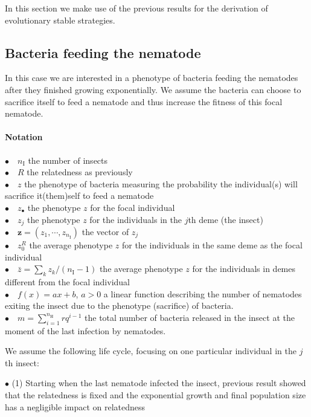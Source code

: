 \documentclass{article}
\newcommand{\nN}{{n_\textrm{H}}}
\newcommand{\nI}{{n_\textrm{I}}}
\begin{document}
 In this section we make use of the previous results for the derivation of evolutionary stable strategies.
 \subsection{Bacteria feeding the nematode}
 In this case we are interested in a phenotype of bacteria feeding the nematodes after they finished growing exponentially. We assume the bacteria can choose to sacrifice itself to feed a nematode and thus increase the fitness of this focal nematode.
 
  \paragraph{Notation} $ $\\
 $\bullet \quad \nI$ the number of insects \\
 $\bullet \quad R$ the relatedness as previously \\
 $\bullet \quad z$ the phenotype of bacteria measuring the probability the individual(s) will sacrifice it(them)self to feed a nematode\\
 $\bullet \quad z_\bullet $ the phenotype $z$ for the focal individual\\
 $\bullet \quad z_j$ the phenotype $z$ for the individuals in the $j$th deme (the insect)\\
 $\bullet \quad \mathbf{z}=(z_1,\cdots,z_{\nI})$ the vector of $z_j$\\
 $\bullet \quad z_0^R$ the average phenotype $z$ for the individuals in the same deme as the focal individual\\
 $\bullet \quad \bar{z}=\sum_k z_k / (\nI -1) $ the average phenotype $z$ for the individuals in demes different from the focal individual\\
 $\bullet \quad f (x)=ax+b$, $a>0$ a linear function describing the number of nematodes exiting the insect due to the phenotype (sacrifice) of bacteria.\\
 $\bullet \quad m=\sum_{i=1}^\nN r q^{i-1}$ the total number of bacteria released in the insect at the moment of the last infection by nematodes.
 
 We assume the following life cycle, focusing on one particular individual in the $j$th insect:
 
 
 $\bullet$ (1) Starting when the last nematode infected the insect, previous result showed that the relatedness is fixed and the exponential growth and final population size has a negligible impact on relatedness
 
\end{document}
